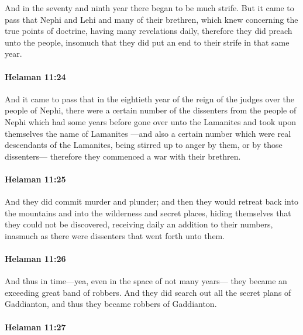 			And in the seventy and ninth year there began to be much strife.
			But it came to pass that Nephi and Lehi and many of their brethren,
			which knew concerning the true points of doctrine,
			having many revelations daily,
			therefore they did preach unto the people,
			insomuch that they did put an end to their strife in that same year.

		\paragraph{Helaman 11:24} %
			\label{HELAMAN-11-24}

			And it came to pass that in the eightieth year
			of the reign of the judges over the people of Nephi,
			there were a certain number of the dissenters from the people of Nephi
			which had some years before gone over unto the Lamanites
			and took upon themselves the name of Lamanites
			---and also a certain number which were real descendants of the Lamanites,
			being stirred up to anger by them, or by those dissenters---
			therefore they commenced a war with their brethren.

		\paragraph{Helaman 11:25} %
			\label{HELAMAN-11-25}

			And they did commit murder and plunder;
			and then they would retreat back into the mountains
			and into the wilderness and secret places,
			hiding themselves that they could not be discovered,
			receiving daily an addition to their numbers,
			inasmuch as there were dissenters that went forth unto them.

		\paragraph{Helaman 11:26} %
			\label{HELAMAN-11-26}

			And thus in time---yea, even in the space of not many years---
			they became an exceeding great band of robbers.
			And they did search out all the secret plans of Gaddianton,
			and thus they became robbers of Gaddianton.

		\paragraph{Helaman 11:27} %
			\label{HELAMAN-11-27}

